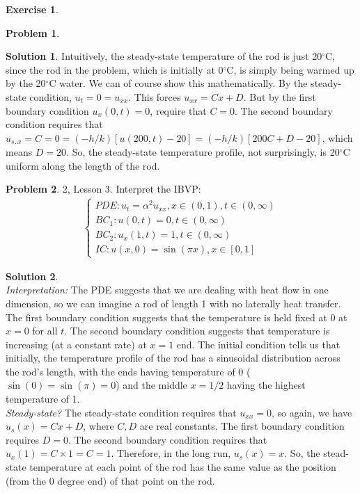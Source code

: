 \documentclass{article}
\theoremstyle{definition}
\newtheorem{sln}{Solution}[section]
\newtheorem*{prob*}{Problem}
\newtheorem{exer}{Exercise}[section]
\begin{document}
\begin{exer}
\begin{prob*}
\begin{sln}
			Intuitively, the steady-state temperature of the rod is just 20$^\circ$C, since the rod in the problem, which is initially at 0$^\circ$C, is simply being warmed up by the 20$^\circ$C water. We can of course show this mathematically. By the steady-state condition, $u_t = 0 = u_{xx}$. This forces $u_{xx} = Cx + D$. But by the first boundary condition $u_x(0,t)=0$, require that $C = 0$. The second boundary condition requires that $u_{s,x} = C = 0 = (-h/k)[u(200,t) -20] = (-h/k)[200C + D - 20]$, which means $D=20$. So, the steady-state temperature profile, not surprisingly, is 20$^\circ$C uniform along the length of the rod. 
		\end{sln}
	\end{prob*}
	\newpage
	\begin{prob*}2, Lesson 3. Interpret the IBVP:
		\begin{align*}
		\begin{cases}
		PDE: u_t = \alpha^2 u_{xx}, x\in(0,1), t\in(0,\infty)\\
		BC_1: u(0,t) = 0, t\in(0,\infty)\\
		BC_2: u_x(1,t) = 1, t\in(0,\infty)\\
		IC: u(x,0) = \sin(\pi x), x\in[0,1]
		\end{cases}
		\end{align*}
		\begin{sln}
			$\,$\\
			
			\textit{Interpretation:} The PDE suggests that we are dealing with heat flow in one dimension, so we can imagine a rod of length 1 with no laterally heat transfer. The first boundary condition suggests that the temperature is held fixed at 0 at $x=0$ for all $t$. The second boundary condition suggests that temperature is increasing (at a constant rate) at $x=1$ end. The initial condition tells us that initially, the temperature profile of the rod has a sinusoidal distribution across the rod's length, with the ends having temperature of 0 ($\sin(0)=\sin(\pi) = 0$) and the middle $x=1/2$ having the highest temperature of 1. \\
			
			\textit{Steady-state?} The steady-state condition requires that $u_{xx} = 0$, so again, we have $u_s(x) = Cx +D$, where $C,D$ are real constants. The first boundary condition requires $D=0$. The second boundary condition requires that $u_x(1) = C\times 1 = C = 1$. Therefore, in the long run, $u_s(x) = x$. So, the stead-state temperature at each point of the rod has the same value as the position (from the 0 degree end) of that point on the rod. \\
			

\end{sln}
\end{prob*}
\end{exer}
\end{document}
